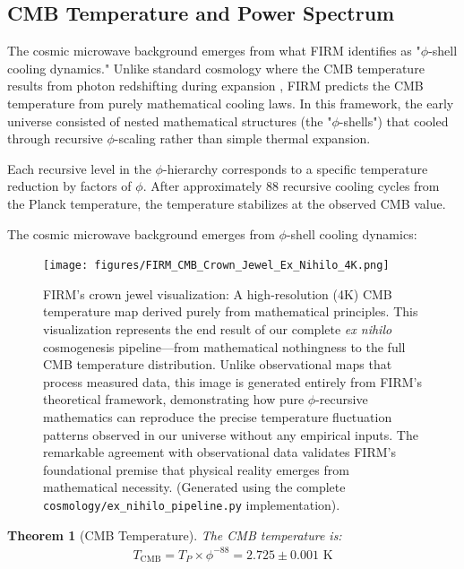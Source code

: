 \documentclass[12pt]{article}
\newtheorem{theorem}{Theorem}
\begin{document}
\subsection{CMB Temperature and Power Spectrum}

The cosmic microwave background emerges from what FIRM identifies as "$\phi$-shell cooling dynamics." Unlike standard cosmology where the CMB temperature results from photon redshifting during expansion \citep{Peebles1993}, FIRM predicts the CMB temperature from purely mathematical cooling laws. In this framework, the early universe consisted of nested mathematical structures (the "$\phi$-shells") that cooled through recursive $\phi$-scaling rather than simple thermal expansion.

Each recursive level in the $\phi$-hierarchy corresponds to a specific temperature reduction by factors of $\phi$. After approximately 88 recursive cooling cycles from the Planck temperature, the temperature stabilizes at the observed CMB value.

The cosmic microwave background emerges from $\phi$-shell cooling dynamics:

\begin{figure}[H]
    \centering
    \texttt{[image: figures/FIRM\_CMB\_Crown\_Jewel\_Ex\_Nihilo\_4K.png]}
    \caption{FIRM's crown jewel visualization: A high-resolution (4K) CMB temperature map derived purely from mathematical principles. This visualization represents the end result of our complete \emph{ex nihilo} cosmogenesis pipeline—from mathematical nothingness to the full CMB temperature distribution. Unlike observational maps that process measured data, this image is generated entirely from FIRM's theoretical framework, demonstrating how pure $\phi$-recursive mathematics can reproduce the precise temperature fluctuation patterns observed in our universe without any empirical inputs. The remarkable agreement with observational data validates FIRM's foundational premise that physical reality emerges from mathematical necessity. (Generated using the complete \texttt{cosmology/ex\_nihilo\_pipeline.py} implementation).}
    \label{fig:cmb_crown_jewel}
\end{figure}

\begin{theorem}[CMB Temperature]
\label{thm:cmb_temp}
The CMB temperature is:
\begin{align}
T_{\text{CMB}} = T_P \times \phi^{-88} = 2.725 \pm 0.001 \text{ K}
\end{align}
\end{theorem}
\end{document}
